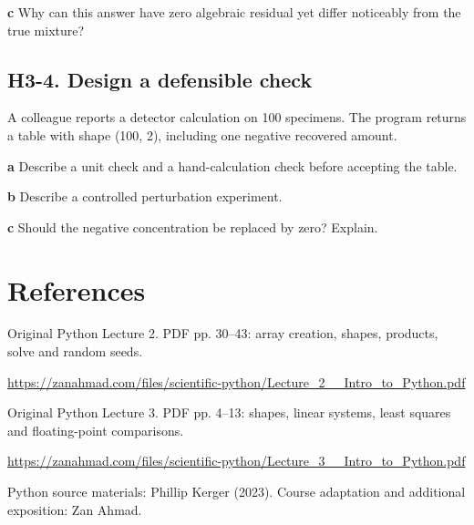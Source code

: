 \documentclass[11pt,letterpaper]{article}
\theoremstyle{definition}\newtheorem{definition}{Definition}\newtheorem{example}{Example}
\numberwithin{equation}{section}
\begin{document}
\textbf{c} Why can this answer have zero algebraic residual yet differ noticeably from the true mixture?

\par\noindent\begin{minipage}{\linewidth}
\subsection*{H3-4. Design a defensible check}
A colleague reports a detector calculation on 100 specimens. The program returns a table with shape (100, 2), including one negative recovered amount.

\textbf{a} Describe a unit check and a hand-calculation check before accepting the table.

\end{minipage}\par\medskip
\textbf{b} Describe a controlled perturbation experiment.

\textbf{c} Should the negative concentration be replaced by zero? Explain.

\section*{References}
\noindent\begin{minipage}{\linewidth}
Original Python Lecture 2. PDF pp. 30--43: array creation, shapes, products, solve and random seeds.

\url{https://zanahmad.com/files/scientific-python/Lecture_2__Intro_to_Python.pdf}
\end{minipage}\par\medskip
\noindent\begin{minipage}{\linewidth}
Original Python Lecture 3. PDF pp. 4--13: shapes, linear systems, least squares and floating-point comparisons.

\url{https://zanahmad.com/files/scientific-python/Lecture_3__Intro_to_Python.pdf}
\end{minipage}\par\medskip
Python source materials: Phillip Kerger (2023). Course adaptation and additional exposition: Zan Ahmad.
\end{document}
